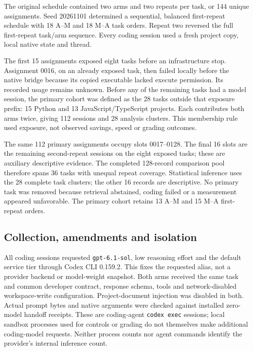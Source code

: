 \documentclass[manuscript,screen,nonacm]{acmart}
\begin{document}
The original schedule contained two arms and two repeats per task, or
144 unique assignments. Seed 20261101 determined a sequential, balanced
first-repeat schedule with 18 A--M and 18 M--A task orders. Repeat two
reversed the full first-repeat task/arm sequence. Every coding session
used a fresh project copy, local native state and thread.

The first 15 assignments exposed eight tasks before an infrastructure
stop. Assignment 0016, on an already exposed task, then failed locally
before the native bridge because its copied executable lacked execute
permission. Its recorded usage remains unknown. Before any of the
remaining tasks had a model session, the primary cohort was defined as
the 28 tasks outside that exposure prefix: 15 Python and 13
JavaScript/TypeScript projects. Each contributes both arms twice, giving
112 sessions and 28 analysis clusters. This membership rule used
exposure, not observed savings, speed or grading outcomes.

The same 112 primary assignments occupy slots 0017--0128. The final 16
slots are the remaining second-repeat sessions on the eight exposed
tasks; these are auxiliary descriptive evidence. The completed
128-record comparison pool therefore spans 36 tasks with unequal repeat
coverage. Statistical inference uses the 28 complete task clusters; the
other 16 records are descriptive. No primary task was removed because
retrieval abstained, coding failed or a measurement appeared
unfavorable. The primary cohort retains 13 A--M and 15 M--A first-repeat
orders.

\subsection{Collection, amendments and
isolation}\label{collection-amendments-and-isolation}

All coding sessions requested \texttt{gpt-6.1-sol}, low reasoning effort
and the default service tier through Codex CLI 0.159.2. This fixes the
requested alias, not a provider backend or model-weight snapshot. Both
arms received the same task and common developer contract, response
schema, tools and network-disabled workspace-write configuration.
Project-document injection was disabled in both. Actual prompt bytes and
native arguments were checked against installed zero-model handoff
receipts. These are coding-agent \texttt{codex\ exec} sessions; local
sandbox processes used for controls or grading do not themselves make
additional coding-model requests. Neither process counts nor agent
commands identify the provider's internal inference count.
\end{document}
